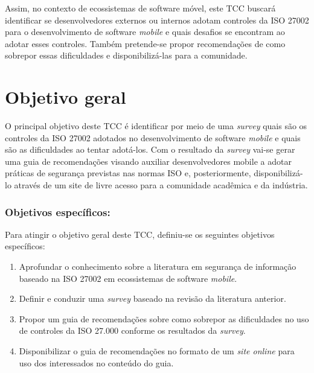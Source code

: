 Assim, no contexto de ecossistemas de software móvel, este TCC buscará identificar se desenvolvedores externos ou internos adotam controles da ISO 27002 para o desenvolvimento de software \textit{mobile} e quais desafios se encontram ao adotar esses controles. Também pretende-se propor recomendações de como sobrepor essas dificuldades e disponibilizá-las para a comunidade.



\section{Objetivo geral}

O principal objetivo deste TCC é identificar por meio de uma \textit{survey} quais são os controles da ISO 27002 adotados no desenvolvimento de software \textit{mobile} e quais são as dificuldades ao tentar adotá-los. Com o resultado da \textit{survey} vai-se gerar uma guia de recomendações visando auxiliar desenvolvedores mobile a adotar práticas de segurança previstas nas normas ISO e, posteriormente, disponibilizá-lo através de um site de livre acesso para a comunidade acadêmica e da indústria.
 
\subsubsection{\textbf{Objetivos específicos:}}

Para atingir o objetivo geral deste TCC, definiu-se os seguintes objetivos específicos:

\begin{enumerate}
    \item Aprofundar o conhecimento sobre a literatura em segurança de informação baseado na ISO 27002 em ecossistemas de software \textit{mobile}.
    \item Definir e conduzir uma \textit{survey} baseado na revisão da literatura anterior.
    \item Propor um guia de recomendações sobre como sobrepor as dificuldades no uso de controles da ISO 27.000 conforme os resultados da \textit{survey}.
    \item Disponibilizar o guia de recomendações no formato de um \textit{site online} para uso dos interessados no conteúdo do guia.
\end{enumerate}


